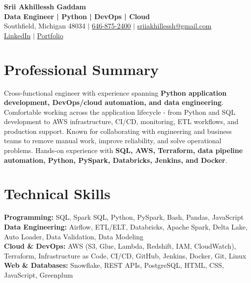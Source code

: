 \documentclass[letterpaper,10pt]{article}
\begin{document}
\fontsize{9.35pt}{10.45pt}\selectfont

\begin{center}
    {\LARGE \textbf{Srii Akhillessh Gaddam}} \\[-1pt]
    \textbf{Data Engineer | Python | DevOps | Cloud} \\[2pt]
    Southfield, Michigan 48034 $|$
    \href{tel:6468752400}{646-875-2400} $|$
    \href{mailto:sriiakhillessh@gmail.com}{sriiakhillessh@gmail.com} \\[1pt]
    \href{https://www.linkedin.com/in/srii-akhiilessh-gaddam-b48668191/}{LinkedIn} $|$
    \href{https://sriiakhillesshg.github.io/portfolio/}{Portfolio}
\end{center}
\vspace{-8pt}

\section{Professional Summary}
\small{Cross-functional engineer with experience spanning \textbf{Python application development, DevOps/cloud automation, and data engineering}. Comfortable working across the application lifecycle - from Python and SQL development to AWS infrastructure, CI/CD, monitoring, ETL workflows, and production support. Known for collaborating with engineering and business teams to remove manual work, improve reliability, and solve operational problems. Hands-on experience with \textbf{SQL, AWS, Terraform, data pipeline automation, Python, PySpark, Databricks, Jenkins, and Docker}.}

\section{Technical Skills}
\small{
\textbf{Programming:} SQL, Spark SQL, Python, PySpark, Bash, Pandas, JavaScript \\
\textbf{Data Engineering:} Airflow, ETL/ELT, Databricks, Apache Spark, Delta Lake, Auto Loader, Data Validation, Data Modeling \\
\textbf{Cloud \& DevOps:} AWS (S3, Glue, Lambda, Redshift, IAM, CloudWatch), Terraform, Infrastructure as Code, CI/CD, GitHub, Jenkins, Docker, Git, Linux \\
\textbf{Web \& Databases:} Snowflake, REST APIs, PostgreSQL, HTML, CSS, JavaScript, Greenplum
}
\end{document}
